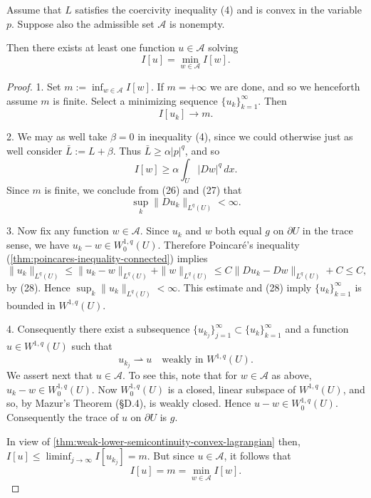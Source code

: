 \begin{theorem}
\label{thm:existence-minimizer-convex-coercive}
Assume that $L$ satisfies the coercivity inequality (4) and is convex in the variable $p$. Suppose also the admissible set $\mathcal{A}$ is nonempty.

Then there exists at least one function $u \in \mathcal{A}$ solving
\[
I[u] = \min_{w \in \mathcal{A}} I[w] .
\]
\end{theorem}
\begin{proof}
1. Set $m := \inf_{w \in \mathcal{A}} I[w]$. If $m = +\infty$ we are done, and so we henceforth assume $m$ is finite. Select a minimizing sequence $\{u_k\}_{k=1}^\infty$. Then
\[
I[u_k] \to m.
\tag{26}
\]

2. We may as well take $\beta = 0$ in inequality (4), since we could otherwise just as well consider $\bar{L} := L + \beta$. Thus $\bar{L} \geq \alpha|p|^q$, and so
\[
I[w] \geq \alpha \int_U |Dw|^q \, dx.
\tag{27}
\]
Since $m$ is finite, we conclude from (26) and (27) that
\[
\sup_k \|Du_k\|_{L^q(U)} < \infty.
\tag{28}
\]

3. Now fix any function $w \in \mathcal{A}$. Since $u_k$ and $w$ both equal $g$ on $\partial U$ in the trace sense, we have $u_k - w \in W_0^{1,q}(U)$. Therefore Poincaré's inequality (\cref{thm:poincares-inequality-connected}) implies
\[
\|u_k\|_{L^q(U)} \leq \|u_k - w\|_{L^q(U)} + \|w\|_{L^q(U)} \leq C\|Du_k - Dw\|_{L^q(U)} + C \leq C,
\]
by (28). Hence $\sup_k \|u_k\|_{L^q(U)} < \infty$. This estimate and (28) imply $\{u_k\}_{k=1}^\infty$ is bounded in $W^{1,q}(U)$.

4. Consequently there exist a subsequence $\{u_{k_j}\}_{j=1}^\infty \subset \{u_k\}_{k=1}^\infty$ and a function $u \in W^{1,q}(U)$ such that
\[
u_{k_j} \rightharpoonup u \quad \text{weakly in } W^{1,q}(U).
\]
We assert next that $u \in \mathcal{A}$. To see this, note that for $w \in \mathcal{A}$ as above, $u_k - w \in W_0^{1,q}(U)$. Now $W_0^{1,q}(U)$ is a closed, linear subspace of $W^{1,q}(U)$, and so, by Mazur's Theorem (\S D.4), is weakly closed. Hence $u - w \in W_0^{1,q}(U)$. Consequently the trace of $u$ on $\partial U$ is $g$.

In view of \cref{thm:weak-lower-semicontinuity-convex-lagrangian} then, $I[u] \leq \liminf_{j \to \infty} I[u_{k_j}] = m$. But since $u \in \mathcal{A}$, it follows that
\[
I[u] = m = \min_{w \in \mathcal{A}} I[w].
\]
\end{proof}

